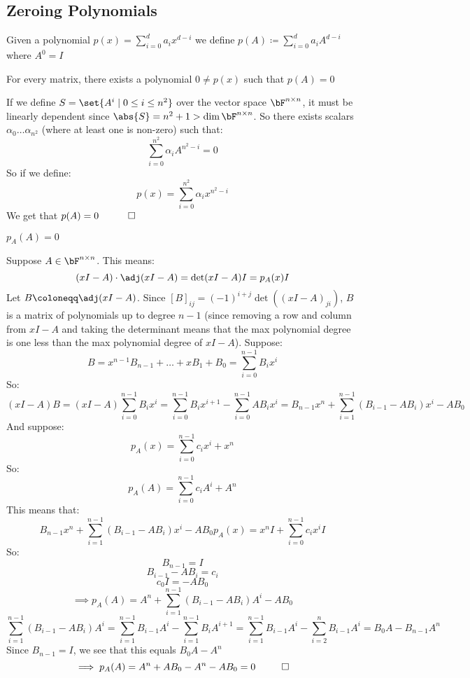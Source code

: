 \documentclass[10pt]{article}
\begin{document}
\newpage
\subsection{Zeroing Polynomials}

\begin{definition*}

Given a polynomial $p(x) = \displaystyle\sum_{i=0}^d a_i x^{d-i}$ we define $p(A)\coloneqq\displaystyle\sum_{i=0}^d a_i A^{d-i}$ where $A^0=I$

\end{definition*}

\begin{lemma*}{For every matrix, there exists a polynomial $0\neq p(x)$ such that $p(A)=0$}

If we define $S=\set{A^i\mid 0\leq i\leq n^2}$ over the vector space $\bF^{n\times n}$, it must be linearly dependent since $\abs{S}=n^2+1>\dim\bF^{n\times n}$. So there exists scalars $\alpha_0\dots \alpha_{n^2}$ (where at least one is non-zero) such that:
\[ \sum_{i=0}^{n^2} \alpha_i A^{n^2-i} = 0 \]
So if we define:
\[ p(x) = \sum_{i=0}^{n^2} \alpha_i x^{n^2-i} \]
We get that $p(A)=0~~~\qed$

\end{lemma*}

\newpage

\begin{theorem}{$p_A(A)=0$}

Suppose $A\in\bF^{n\times n}$. This means:
\[ (xI - A)\cdot\adj(xI-A) = \det(xI-A)I = p_A(x)I \]
Let $B\coloneqq\adj(xI-A)$. Since $[B]_{ij} = (-1)^{i+j}\det((xI-A)_{ji})$, $B$ is a matrix of polynomials up to degree $n-1$ (since removing a row and column from $xI-A$ and taking the determinant means that the max polynomial degree is one less than the max polynomial degree of $xI-A$). Suppose:
\[ B = x^{n-1}B_{n-1} + \dots + xB_1 + B_0 = \sum_{i=0}^{n-1} B_i x^i \]
So:
\[ (xI-A)B = (xI-A)\sum_{i=0}^{n-1} B_i x^i = \sum_{i=0}^{n-1} B_i x^{i+1} -  \sum_{i=0}^{n-1} AB_i x^i = B_{n-1}x^n+\sum_{i=1}^{n-1} (B_{i-1}-AB_i)x^i - AB_0 \]
And suppose:
\[ p_A(x) = \sum_{i=0}^{n-1} c_i x^i + x^n \]
So:
\[ p_A(A) = \sum_{i=0}^{n-1} c_i A^i + A^n \]
This means that:
\[ B_{n-1}x^n+\sum_{i=1}^{n-1} (B_{i-1}-AB_i)x^i - AB_0 p_A(x) = x^nI + \sum_{i=0}^{n-1} c_i x^iI \]
So:
\[ B_{n-1} = I \]
\[ B_{i-1}-AB_i = c_i \]
\[ c_0I = -AB_0 \]
\[ \implies p_A(A) = A^n + \sum_{i=1}^{n-1} (B_{i-1}-AB_i) A^i -AB_0 \]
\[ \sum_{i=1}^{n-1} (B_{i-1}-AB_i)A^i = \sum_{i=1}^{n-1} B_{i-1}A^i - \sum_{i=1}^{n-1}B_iA^{i+1} = \sum_{i=1}^{n-1} B_{i-1}A^i - \sum_{i=2}^n B_{i-1}A^i = B_0A - B_{n-1}A^n \]
Since $B_{n-1}=I$, we see that this equals $B_0A-A^n$
\[ \implies p_A(A) = A^n + AB_0 - A^n - AB_0 = 0 ~~ \qed \]
\end{theorem}
\end{document}
